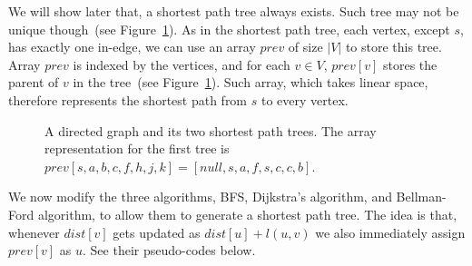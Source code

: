 We will show later that, a shortest path tree always exists. %
Such tree may not be unique though~(see Figure~\ref{fig:tree}).
As in the shortest path tree, each vertex, except $s$, has exactly one in-edge, we can use an array $prev$ of size $|V|$
to store this tree. Array $prev$ is indexed by the vertices, and for each $v\in V$, $prev[v]$ stores the parent of $v$
in the tree~(see Figure~\ref{fig:tree}).
Such array, which takes linear space, therefore represents the shortest path from $s$ to every vertex.

\begin{figure}[h]
\centering{}
\caption{A directed graph and its two shortest path trees. The array representation
for the first tree is $prev[s,a,b,c,f,h,j,k] = [null, s, a, f, s, c, c, b]$.}
\label{fig:tree}
\end{figure}



We now modify the three algorithms, BFS, Dijkstra's algorithm, and Bellman-Ford algorithm, to allow them to generate a shortest path tree.
The idea is that, %
whenever $dist[v]$ gets updated as $dist[u] + l(u,v)$ we also immediately assign $prev[v]$ as $u$.
See their pseudo-codes below.

\begin{algorithmblock}[0.8\textwidth]
	\xxx
	\xxx
	\aab {\textcolor{blue}{$prev[v] = null$, for any $v\in V$};}\xxx
	\xxx
	\xxx
	\xxx
	\xxx
	\xxx
	\xxx
	\xxx
	\xxx
	\xxx
	\aae {\textcolor{blue}{$prev[v] = u$;}}\xxx
	\xxx
\end{algorithmblock}


\begin{algorithmblock}[0.8\textwidth]
	\xxx
	\xxx
	\aab {\textcolor{blue}{$prev[v] = null$, for any $v\in V$};}\xxx
	\xxx
	\xxx
	\xxx
	\xxx
	\xxx
	\xxx
	\xxx
	\xxx
	\xxx
	\xxx
	\aae {\textcolor{blue}{$prev[v] = u$;}}\xxx
	\xxx
\end{algorithmblock}


